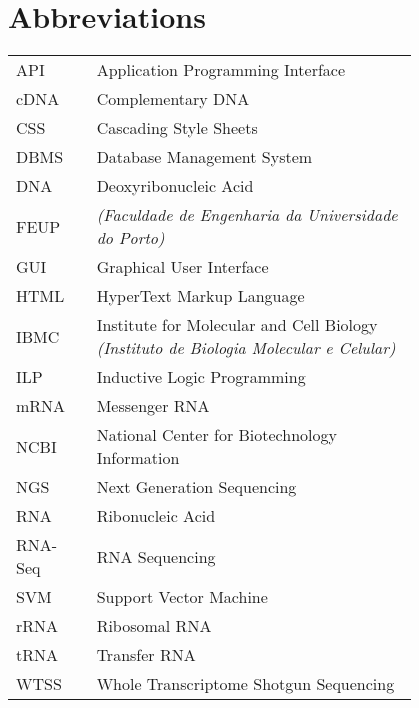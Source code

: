 \chapter*{Abbreviations}

\begin{flushleft}
\begin{tabular}{l p{0.8\linewidth}}
API       & Application Programming Interface\\
cDNA      & Complementary DNA\\
CSS       & Cascading Style Sheets\\
DBMS      & Database Management System\\
DNA       & Deoxyribonucleic Acid\\
FEUP      & \Feup{} \textit{(Faculdade de Engenharia da Universidade do Porto)}\\
GUI       & Graphical User Interface\\
HTML      & HyperText Markup Language\\
IBMC      & Institute for Molecular and Cell Biology \textit{(Instituto de Biologia Molecular e Celular)}\\
ILP       & Inductive Logic Programming\\
mRNA      & Messenger RNA\\
NCBI      & National Center for Biotechnology Information\\
NGS       & Next Generation Sequencing\\
RNA       & Ribonucleic Acid\\
RNA-Seq   & RNA Sequencing\\
SVM       & Support Vector Machine\\
rRNA      & Ribosomal RNA\\
tRNA      & Transfer RNA\\
WTSS      & Whole Transcriptome Shotgun Sequencing\\
\end{tabular}
\end{flushleft}

